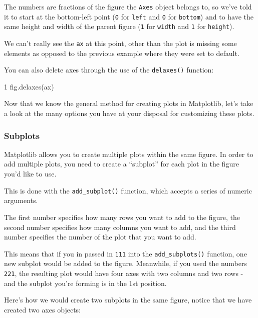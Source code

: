 \documentclass[11pt]{article}
\newenvironment{Shaded}{}{}
\newcommand{\DecValTok}[1]{\textcolor[rgb]{0.25,0.63,0.44}{{#1}}}
\newcommand{\NormalTok}[1]{{#1}}
\begin{document}
The numbers are fractions of the figure the \texttt{Axes} object belongs
to, so we've told it to start at the bottom-left point (\texttt{0} for
\texttt{left} and \texttt{0} for \texttt{bottom}) and to have the same
height and width of the parent figure (\texttt{1} for \texttt{width} and
\texttt{1} for \texttt{height}).

We can't really see the \texttt{ax} at this point, other than the plot
is missing some elements as opposed to the previous example where they
were set to default.

You can also delete axes through the use of the \texttt{delaxes()}
function:

\begin{Shaded}
\begin{Highlighting}[]
    \DecValTok{1}\NormalTok{ fig.delaxes(ax)}
\end{Highlighting}
\end{Shaded}

Now that we know the general method for creating plots in Matplotlib,
let's take a look at the many options you have at your disposal for
customizing these plots.

\subsubsection{Subplots}\label{subplots}

Matplotlib allows you to create multiple plots within the same figure.
In order to add multiple plots, you need to create a ``subplot'' for
each plot in the figure you'd like to use.

This is done with the \texttt{add\_subplot()} function, which accepts a
series of numeric arguments.

The first number specifies how many rows you want to add to the figure,
the second number specifies how many columns you want to add, and the
third number specifies the number of the plot that you want to add.

This means that if you in passed in \texttt{111} into the
\texttt{add\_subplots()} function, one new subplot would be added to the
figure. Meanwhile, if you used the numbers \texttt{221}, the resulting
plot would have four axes with two columns and two rows - and the
subplot you're forming is in the 1st position.

Here's how we would create two subplots in the same figure, notice that
we have created two axes objects:
\end{document}
